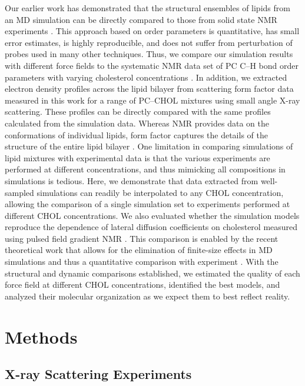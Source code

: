 \documentclass[aps,prl,superscriptaddress]{revtex4-2}
\begin{document}
Our earlier work has demonstrated that the structural ensembles of lipids from an MD simulation can be directly compared to those from solid state NMR experiments \cite{botan15,catte2016molecular,antila2019headgroup,bacle2021inverse}. This approach based on order parameters is quantitative, has small error estimates, is highly reproducible, and does not suffer from perturbation of probes used in many other techniques. Thus, we compare our simulation results with different force fields to the systematic NMR data set of PC C--H bond order parameters with varying cholesterol concentrations \cite{ferreira13}. In addition, we extracted electron density profiles across the lipid bilayer from scattering form factor data measured in this work for a range of PC--CHOL mixtures using small angle X-ray scattering. These profiles can be directly compared with the same profiles calculated from the simulation data. Whereas NMR provides data on the conformations of individual lipids, form factor captures the details of the structure of the entire lipid bilayer \cite{ollila16}. One limitation in comparing simulations of lipid mixtures with experimental data is that the various experiments are performed at different concentrations, and thus mimicking all compositions in simulations is tedious. Here, we demonstrate that data extracted from well-sampled simulations can readily be interpolated to any CHOL concentration, allowing the comparison of a single simulation set to experiments performed at different CHOL concentrations. We also evaluated whether the simulation models reproduce the dependence of lateral diffusion coefficients on cholesterol measured using pulsed field gradient NMR \cite{filippov2003effect,filippov2003influence}. This comparison is enabled by the recent theoretical work that allows for the elimination of finite-size effects in MD simulations and thus a quantitative comparison with experiment \cite{vogele2016divergent,vogele2018hydrodynamics}. With the structural and dynamic comparisons established, we estimated the quality of each force field at different CHOL concentrations, identified the best models, and analyzed their molecular organization as we expect them to best reflect reality.

\section{Methods}

\subsection{X-ray Scattering Experiments}
\end{document}
